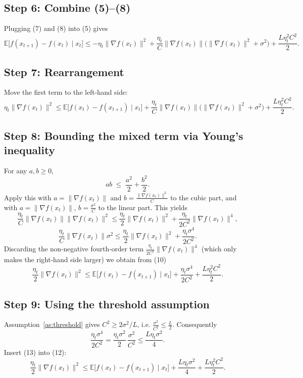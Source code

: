\documentclass{article}
\newcommand{\E}{\mathbb{E}}
\newcommand{\norm}[1]{\left\lVert #1\right\rVert}
\begin{document}
\subsection*{Step 6: Combine (5)–(8)}
Plugging (7) and (8) into (5) gives
\[
\E\!\bigl[f(x_{t+1})-f(x_t)\mid x_t\bigr]
\le
-\eta_t\|\nabla f(x_t)\|^{2}
+\frac{\eta_t}{C}\norm{\nabla f(x_t)}\bigl(\|\nabla f(x_t)\|^{2}+\sigma^{2}\bigr)
+\frac{L\eta_t^{2}C^{2}}{2}. \tag{9}
\]

\subsection*{Step 7: Rearrangement}
Move the first term to the left‑hand side:
\[
\eta_t\|\nabla f(x_t)\|^{2}
\le
\E\!\bigl[f(x_t)-f(x_{t+1})\mid x_t\bigr]
+\frac{\eta_t}{C}\norm{\nabla f(x_t)}\bigl(\|\nabla f(x_t)\|^{2}+\sigma^{2}\bigr)
+\frac{L\eta_t^{2}C^{2}}{2}. \tag{10}
\]

\subsection*{Step 8: Bounding the mixed term via Young’s inequality}
For any $a,b\ge0$,
\[
ab\;\le\;\frac{a^{2}}{2}+\frac{b^{2}}{2}.
\]
Apply this with $a=\norm{\nabla f(x_t)}$ and $b=\frac{\|\nabla f(x_t)\|^{2}}{C}$
to the cubic part, and with $a=\norm{\nabla f(x_t)}$, $b=\frac{\sigma^{2}}{C}$
to the linear part.  This yields
\[
\frac{\eta_t}{C}\norm{\nabla f(x_t)}\|\nabla f(x_t)\|^{2}
\le
\frac{\eta_t}{2}\|\nabla f(x_t)\|^{2}
+\frac{\eta_t}{2C^{2}}\|\nabla f(x_t)\|^{4},
\]
\[
\frac{\eta_t}{C}\norm{\nabla f(x_t)}\sigma^{2}
\le
\frac{\eta_t}{2}\|\nabla f(x_t)\|^{2}
+\frac{\eta_t\sigma^{4}}{2C^{2}}. \tag{11}
\]
Discarding the non‑negative fourth‑order term $\frac{\eta_t}{2C^{2}}\|\nabla f(x_t)\|^{4}$
(which only makes the right‑hand side larger) we obtain from (10)
\[
\frac{\eta_t}{2}\|\nabla f(x_t)\|^{2}
\le
\E\!\bigl[f(x_t)-f(x_{t+1})\mid x_t\bigr]
+\frac{\eta_t\sigma^{4}}{2C^{2}}
+\frac{L\eta_t^{2}C^{2}}{2}. \tag{12}
\]

\subsection*{Step 9: Using the threshold assumption}
Assumption~\ref{as:threshold} gives $C^{2}\ge 2\sigma^{2}/L$, i.e.
$\displaystyle \frac{\sigma^{2}}{C^{2}}\le\frac{L}{2}$.
Consequently
\[
\frac{\eta_t\sigma^{4}}{2C^{2}}
= \frac{\eta_t\sigma^{2}}{2}\,\frac{\sigma^{2}}{C^{2}}
\le \frac{L\eta_t\sigma^{2}}{4}. \tag{13}
\]
Insert (13) into (12):
\[
\frac{\eta_t}{2}\|\nabla f(x_t)\|^{2}
\le
\E\!\bigl[f(x_t)-f(x_{t+1})\mid x_t\bigr]
+\frac{L\eta_t\sigma^{2}}{4}
+\frac{L\eta_t^{2}C^{2}}{2}. \tag{14}
\]
\end{document}
